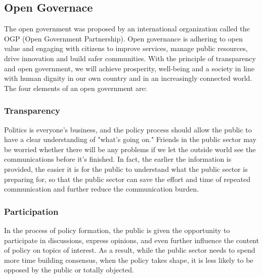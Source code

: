\documentclass{IEEEtran}
\begin{document}


\subsection{Open Governace} 
The open government was proposed by an international organization called the OGP (Open Government Partnership). 
Open governance is adhering to open value and engaging with citizens to improve services, manage public resources, drive innovation and build safer communities. With the principle of transparency and open government, we will achieve prosperity, well-being and a society in line with human dignity in our own country and in an increasingly connected world.
The four elements of an open government are:
\subsubsection{Transparency}
Politics is everyone's business, and the policy process should allow the public to have a clear understanding of "what's going on." Friends in the public sector may be worried whether there will be any problems if we let the outside world see the communications before it's finished. In fact, the earlier the information is provided, the easier it is for the public to understand what the public sector is preparing for, so that the public sector can save the effort and time of repeated communication and further reduce the communication burden. 
\subsubsection{Participation}
In the process of policy formation, the public is given the opportunity to participate in discussions, express opinions, and even further influence the content of policy on topics of interest. As a result, while the public sector needs to spend more time building consensus, when the policy takes shape, it is less likely to be opposed by the public or totally objected.  
\end{document}
